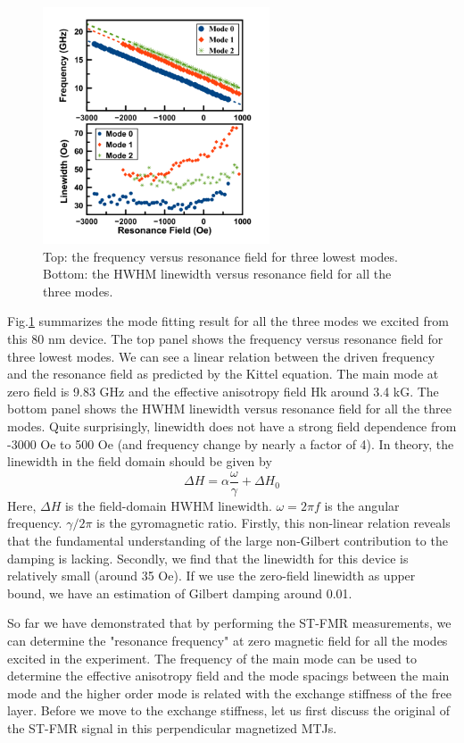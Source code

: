 \begin{figure}[!ht]
  \centering
  \includegraphics[width=0.6\textwidth]{fig/2018/C07fit}
   \caption{Top: the frequency versus resonance field for three lowest modes. Bottom: the HWHM linewidth versus resonance field for all the three modes.  }
  \label{fig:07fit}
\end{figure}

Fig.\ref{fig:07fit} summarizes the mode fitting result for all the three modes we excited from this 80 nm device. The top panel shows the frequency versus resonance field for three lowest modes. We can see a linear relation between the driven frequency and the resonance field as predicted by the Kittel equation. The main mode at zero field is 9.83 GHz and the effective anisotropy field Hk around 3.4 kG. The bottom panel shows the HWHM linewidth versus resonance field for all the three modes. Quite surprisingly, linewidth does not have a strong field dependence from -3000 Oe to 500 Oe (and frequency change by nearly a factor of 4). In theory, the linewidth in the field domain should be given by
\begin{equation}
	\Delta H = \alpha  \frac{\omega}{\gamma} + \Delta H_0
\end{equation}
Here, $\Delta H$ is the field-domain HWHM linewidth. $\omega = 2 \pi f$ is the angular frequency. $\gamma / 2 \pi$ is the gyromagnetic ratio. Firstly, this non-linear relation reveals that the fundamental understanding of the large non-Gilbert contribution to the damping is lacking. Secondly, we find that the linewidth for this device is relatively small (around 35 Oe). If we use the zero-field linewidth as upper bound, we have an estimation of Gilbert damping around 0.01. 


So far we have demonstrated that by performing the ST-FMR measurements, we can determine the "resonance frequency" at zero magnetic field for all the modes excited in the experiment. The frequency of the main mode can be used to determine the effective anisotropy field and the mode spacings between the main mode and the higher order mode is related with the exchange stiffness of the free layer. Before we move to the exchange stiffness, let us first discuss the original of the ST-FMR signal in this perpendicular magnetized MTJs.




